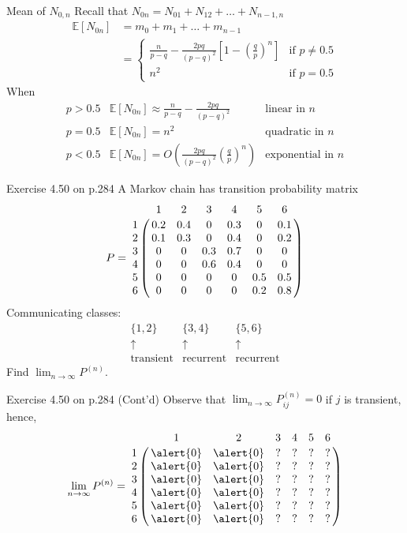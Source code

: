\documentclass[letterpaper]{beamer}
\def\E{\mathbb E}
\begin{document}
\begin{frame}{Mean of $N_{0,n}$}
Recall that $N_{0n}=N_{01}+N_{12}+\ldots+N_{n-1,n}$
\begin{align*}
\E[N_{0n}]&=m_{0}+m_{1}+\ldots+m_{n-1}\\
&=\begin{cases}
\frac{n}{p-q}-\frac{2pq}{(p-q)^2}[1-(\frac{q}{p})^n] &\text{if } p\neq 0.5\\
n^2 & \text{if } p= 0.5
\end{cases}
\end{align*}
When
$$
\begin{array}{cll}
p>0.5& \E[N_{0n}]\approx \frac{n}{p-q}-\frac{2pq}{(p-q)^2} & \text{linear in }n\\[5pt]
p=0.5& \E[N_{0n}]= n^2 & \text{quadratic in }n\\[5pt]
p<0.5& \E[N_{0n}]=O(\frac{2pq}{(p-q)^2}(\frac{q}{p})^n) & \text{exponential in }n
\end{array}
$$
\end{frame}
\begin{frame}{Exercise 4.50 on p.284}
A Markov chain has transition probability matrix
\[
P=
\bordermatrix{%
  &  1  &  2  &  3  &  4  &  5  &  6 \cr
1 & 0.2 & 0.4 &  0  & 0.3 &  0  & 0.1\cr
2 & 0.1 & 0.3 &  0  & 0.4 &  0  & 0.2\cr
3 &  0  &  0  & 0.3 & 0.7 &  0  &  0 \cr
4 &  0  &  0  & 0.6 & 0.4 &  0  &  0 \cr
5 &  0  &  0  &  0  &  0  & 0.5 & 0.5\cr
6 &  0  &  0  &  0  &  0  & 0.2 & 0.8
}
\]
Communicating classes:
\[
\begin{array}{ccc}
\{1,2\}&\{3,4\}&\{5,6\}\\
\uparrow &\uparrow &\uparrow \\
\text{transient}&\text{recurrent}&\text{recurrent}
\end{array}
\]
Find $\lim_{n\to\infty}P^{(n)}.$
\end{frame}
\begin{frame}{Exercise 4.50 on p.284 (Cont'd)}
Observe that
$\lim_{n\to\infty}P^{(n)}_{ij}=0$ if $j$ is transient, hence,
\[
\lim_{n\to\infty}P^{(n)}=
\bordermatrix{%
  &  1  &  2  &  3  &  4  &  5  &  6 \cr
1 & \alert{0} & \alert{0} &  ?  &  ?  &  ?  &  ? \cr
2 & \alert{0} & \alert{0} &  ?  &  ?  &  ?  &  ? \cr
3 & \alert{0} & \alert{0} &  ?  &  ?  &  ?  &  ? \cr
4 & \alert{0} & \alert{0} &  ?  &  ?  &  ?  &  ? \cr
5 & \alert{0} & \alert{0} &  ?  &  ?  &  ?  &  ? \cr
6 & \alert{0} & \alert{0} &  ?  &  ?  &  ?  &  ?
}
\]

\end{frame}
\end{document}
